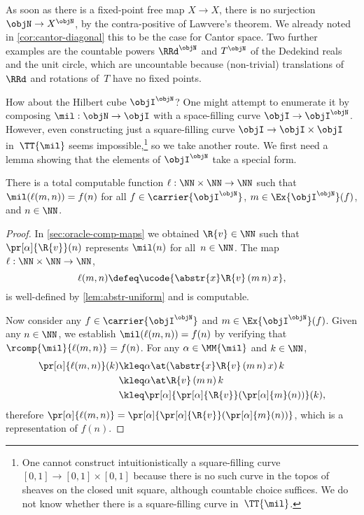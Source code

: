 As soon as there is a fixed-point free map $X \to X$, there is no surjection $\objN \to X^\objN$, by the contra-positive of Lawvere's theorem. We already noted in \cref{cor:cantor-diagonal} this to be the case for Cantor space.
%
Two further examples are the countable powers $\RRd^\objN$ and $T^\objN$ of the Dedekind reals and the unit circle, which are uncountable because (non-trivial) translations of~$\RRd$ and rotations of~$T$ have no fixed points.

How about the Hilbert cube $\objI^\objN$?
One might attempt to enumerate it by composing $\mil : \objN \to \objI$ with a space-filling curve $\objI \to \objI^\objN$. However, even constructing just a square-filling curve $\objI \to \objI \times \objI$ in~$\TT{\mil}$ seems impossible,\footnote{One cannot construct intuitionistically a square-filling curve $[0,1] \to [0,1] \times [0,1]$ because there is no such curve in the topos of sheaves on the closed unit square, although countable choice suffices. We do not know whether there is a square-filling curve in~$\TT{\mil}$.}
 so we take another route.
We first need a lemma showing that the elements of $\objI^\objN$ take a special form.

\begin{lemma}
  \label{lem:flattening-realizers}
  There is a total computable function $\ell : \NN \times \NN \to \NN$ such that $\mil(\ell(m,n)) = f(n)$ for all $f \in \carrier{\objI^\objN}$, $m \in \Ex{\objI^\objN}(f)$, and $n \in \NN$.
\end{lemma}

\begin{proof}
  In \cref{sec:oracle-comp-maps} we obtained $\R{v} \in \NN$ such that $\pr[\alpha]{\R{v}}(n)$ represents $\mil(n)$ for all~$n \in \NN$. The map $\ell : \NN \times \NN \to \NN$,
  \begin{equation*}
    \ell(m, n) \defeq \ucode{\abstr{x} \R{v} \, (m \, n) \, x},
  \end{equation*}
  is well-defined by \cref{lem:abstr-uniform} and is computable.

  Now consider any $f \in \carrier{\objI^\objN}$ and $m \in \Ex{\objI^\objN}(f)$.
  Given any $n \in \NN$, we establish $\mil(\ell(m, n)) = f(n)$ by verifying that $\rcomp{\mil}{\ell(m,n)} = f(n)$.
  For any $\alpha \in \MM{\mil}$ and $k \in \NN$,
  \begin{align*}
    \pr[\alpha]{\ell(m,n)}(k)
    &\kleq \alpha \at (\abstr{x} \R{v} \, (m \, n) \, x) \, k \\
    &\kleq \alpha \at \R{v} \, (m \, n) \, k \\
    &\kleq
         \pr[\alpha]{
           \pr[\alpha]{\R{v}}(
             \pr[\alpha]{m}(n)
           )
         }(k),
  \end{align*}
  therefore $\pr[\alpha]{\ell(m,n)} = \pr[\alpha]{\pr[\alpha]{\R{v}}(\pr[\alpha]{m}(n))}$, which is a representation
  of $f(n)$.
\end{proof}

